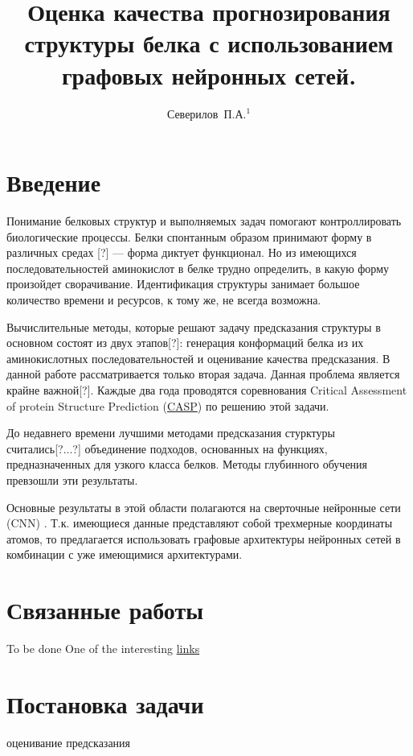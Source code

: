 \documentclass[12pt,twosides]{article}
\title
[Качество структуры белка с  графовыми сетями]
{Оценка качества прогнозирования структуры белка с использованием графовых нейронных сетей.}
\author
[Северилов~П.А.] 
{Северилов~П.А.$^1$}
\begin{document}
	\maketitle
	
	\section{Введение}
	
	Понимание белковых структур и выполняемых задач помогают контроллировать биологические процессы. Белки спонтанным образом принимают форму в различных средах [?] — форма диктует функционал. Но из имеющихся последовательностей аминокислот в белке трудно определить, в какую форму произойдет сворачивание. Идентификация структуры занимает большое количество времени и ресурсов, к тому же, не всегда возможна. 
	
	Вычислительные методы, которые решают задачу предсказания структуры в основном состоят из двух этапов[?]: генерация конформаций белка из их аминокислотных последовательностей и оценивание качества предсказания. В данной работе рассматривается только вторая задача. Данная проблема является крайне важной[?]. Каждые два года проводятся соревнования Critical Assessment of protein Structure Prediction (\href{http://predictioncenter.org/}{CASP}) по решению этой задачи.
	
	До недавнего времени лучшими методами предсказания стурктуры считались[?...?] объединение подходов, основанных на функциях, предназначенных для узкого класса белков. Методы глубинного обучения превзошли \cite{AlphaFold} эти результаты.
	
	Основные результаты в этой области полагаются на сверточные нейронные сети (CNN) \cite{10.1093/bioinformatics/btz122}. Т.к. имеющиеся данные представляют собой трехмерные координаты атомов, то предлагается использовать графовые архитектуры нейронных сетей в комбинации с уже имеющимися архитектурами.
	
	
	\section{Связанные работы}
	To be done
	One of the interesting \href{https://github.com/jdlc105/Must-read-papers-and-continuous-tracking-on-Graph-Neural-Network-GNN-progress}{links}
	
	
	\section{Постановка задачи}
	оценивание предсказания
	
\end{document}
